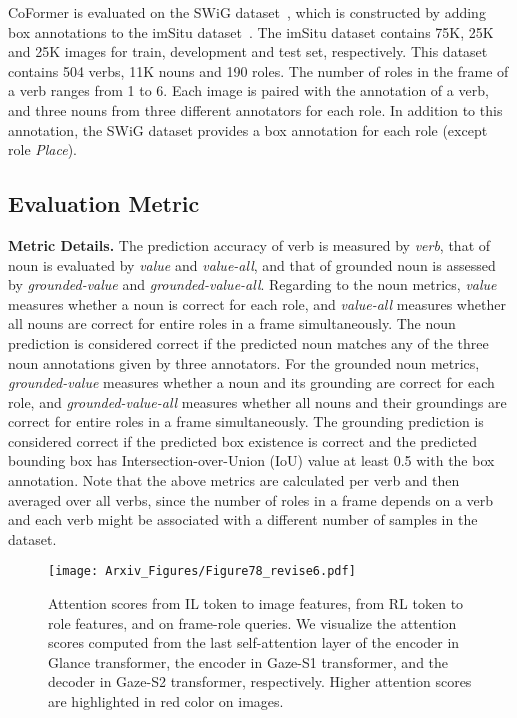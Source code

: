 \mbox{CoFormer} is evaluated on the SWiG dataset~\cite{pratt2020grounded}, which is constructed by adding box annotations to the imSitu dataset~\cite{yatskar2016situation}.
The imSitu dataset contains 75K, 25K and 25K images for train, development and test set, respectively.
This dataset contains 504 verbs, 11K nouns and 190 roles.
The number of roles in the frame of a verb ranges from 1 to 6. 
Each image is paired with the annotation of a verb, and three nouns from three different annotators for each role.
In addition to this annotation, the SWiG dataset provides a box annotation for each role (except role \textit{Place}).

\subsection{Evaluation Metric}
\noindent \textbf{Metric Details.} 
The prediction accuracy of verb is measured by \textit{verb}, that of noun is evaluated by \textit{value} and \mbox{\textit{value-all}}, and that of grounded noun is assessed by \mbox{\textit{grounded-value}} and \mbox{\textit{grounded-value-all}}.
Regarding to the noun metrics, \textit{value} measures whether a noun is correct for each role, and \mbox{\textit{value-all}} measures whether all nouns are correct for entire roles in a frame simultaneously. 
The noun prediction is considered correct if the predicted noun matches any of the three noun annotations given by three annotators.
For the grounded noun metrics, \mbox{\textit{grounded-value}} measures whether a noun and its grounding are correct for each role, and \mbox{\textit{grounded-value-all}} measures whether all nouns and their groundings are correct for entire roles in a frame simultaneously. 
The grounding prediction is considered correct if the predicted box existence is correct and the predicted bounding box has \mbox{Intersection-over-Union} (IoU) value at least 0.5 with the box annotation.
Note that the above metrics are calculated per verb and then averaged over all verbs, since the number of roles in a frame depends on a verb and each verb might be associated with a different number of samples in the dataset.
\begin{figure*}[t!]
    \centering
    \texttt{[image: Arxiv\_Figures/Figure78\_revise6.pdf]}
    \caption{
    Attention scores from IL token to image features, from RL token to role features, and on \mbox{frame-role} queries.
    We visualize the attention scores computed from the last \mbox{self-attention} layer of the encoder in Glance transformer, the encoder in \mbox{Gaze-S1} transformer, and the decoder in \mbox{Gaze-S2} transformer, respectively.
    Higher attention scores are highlighted in red color on images.
    }
    \label{fig:qual_verb}
\end{figure*}
